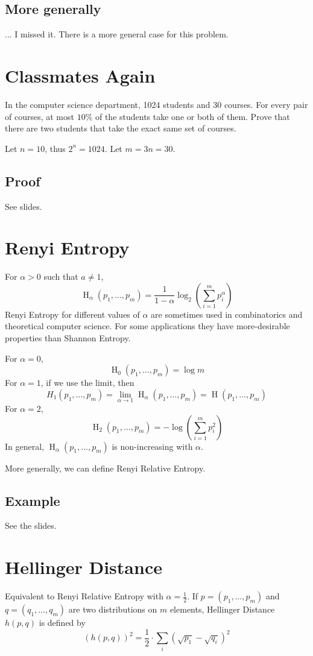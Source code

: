 \documentclass{article}
\begin{document}
\subsection{More generally}
... I missed it.
There is a more general case for this problem.

\section{Classmates Again}

In the computer science department, 1024 students and 30 courses. For every pair of courses, at most $10\%$ of the students take one or both of them. Prove that there are two students that take the exact same set of courses. 

Let $n=10$, thus $2^n=1024$. Let $m=3n=30$.

\subsection{Proof}

See slides.

\section{Renyi Entropy}

For $\alpha>0$ such that $a\neq 1$,
\[
\operatorname{H}_\alpha\left(p_1,\ldots,p_m\right) = \frac{1}{1-\alpha}\log_2\left(\sum_{i=1}^m p_i^\alpha\right)
\]
Renyi Entropy for different values of $\alpha$ are sometimes used in combinatorics and theoretical computer science. For some applications they have more-desirable properties than Shannon Entropy.

For $\alpha =0$,
\[
\operatorname{H}_0\left(p_1,\ldots,p_m\right) = \log m
\]
For $\alpha=1$, if we use the limit, then 
\[
H_1(p_1,\ldots,p_m)=\lim_{\alpha\to 1}\operatorname{H}_\alpha\left(p_1,\ldots,p_m\right) = \operatorname{H}\left(p_1,\ldots,p_m\right)
\]
For $\alpha=2$,
\[
\operatorname{H}_2\left(p_1,\ldots,p_m\right) = -\log \left(\sum_{i=1}^m p_i^2\right)
\]
In general, $\operatorname{H}_\alpha\left(p_1,\ldots,p_m\right)$ is non-increasing with $\alpha$.

More generally, we can define Renyi Relative Entropy.

\subsection{Example}

See the slides.

\section{Hellinger Distance}

Equivalent to Renyi Relative Entropy with $\alpha=\frac{1}{2}$. If $p=\left(p_1,\ldots,p_m\right)$ and $q=\left(q_1,\ldots,q_m\right)$ are two distributions on $m$ elements, Hellinger Distance $h(p,q)$ is defined by 
\[
\left(h(p,q)\right)^2 = \frac{1}{2}\cdot \sum_i \left(\sqrt{p_1}-\sqrt{q_i}\right)^2
\]
\end{document}
